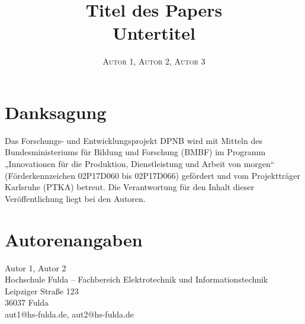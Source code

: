 \documentclass{simple-paper}
\title{Titel des Papers\\{\small Untertitel}}
\author{%
	\textsc{Autor 1}, \textsc{Autor 2}, \textsc{Autor 3}
}
\begin{document}
\maketitle











\section*{Danksagung}
Das Forschungs- und Entwicklungsprojekt DPNB wird mit Mitteln des Bundesministeriums für Bildung und
Forschung (BMBF) im Programm „Innovationen für die Produktion, Dienstleistung und Arbeit von morgen“
(Förderkennzeichen 02P17D060 bis 02P17D066) gefördert und vom Projektträger Karlsruhe (PTKA) betreut.
Die Verantwortung für den Inhalt dieser Veröffentlichung liegt bei den Autoren.

\printbibliography

\vfill

\section*{Autorenangaben}
Autor 1, Autor 2\\
Hochschule Fulda – Fachbereich Elektrotechnik und Informationstechnik\\
Leipziger Straße 123\\
36037 Fulda\\
aut1@hs-fulda.de, aut2@hs-fulda.de\\

\end{document}
